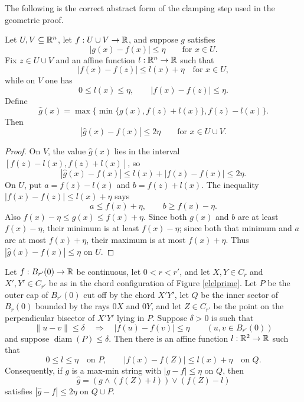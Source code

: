 The following is the correct abstract form of the clamping step used in the geometric proof.

\begin{lemma}
\label{ai:clamping_extension}
Let $U,V\subseteq\mathbb{R}^n$, let $f:U\cup V\to\mathbb{R}$, and suppose $g$ satisfies
\[
|g(x)-f(x)|\leq \eta\qquad\text{for }x\in U.
\]
Fix $z\in U\cup V$ and an affine function $l:\mathbb{R}^n\to\mathbb{R}$ such that
\[
|f(x)-f(z)|\leq l(x)+\eta\quad\text{for }x\in U,
\]
while on $V$ one has
\[
0\leq l(x)\leq\eta,
\qquad
|f(x)-f(z)|\leq\eta.
\]
Define
\[
\widehat g(x)=\max\{\min\{g(x),f(z)+l(x)\},f(z)-l(x)\}.
\]
Then
\[
|\widehat g(x)-f(x)|\leq2\eta\qquad\text{for }x\in U\cup V.
\]
\end{lemma}

\begin{proof}
On $V$, the value $\widehat g(x)$ lies in the interval $[f(z)-l(x),f(z)+l(x)]$, so
\[
|\widehat g(x)-f(x)|\leq l(x)+|f(z)-f(x)|\leq2\eta.
\]
On $U$, put $a=f(z)-l(x)$ and $b=f(z)+l(x)$.  The inequality $|f(x)-f(z)|\leq l(x)+\eta$ says
\[
a\leq f(x)+\eta,
\qquad
b\geq f(x)-\eta.
\]
Also $f(x)-\eta\leq g(x)\leq f(x)+\eta$.  Since both $g(x)$ and $b$ are at least $f(x)-\eta$, their minimum is at least $f(x)-\eta$; since both that minimum and $a$ are at most $f(x)+\eta$, their maximum is at most $f(x)+\eta$.  Thus $|\widehat g(x)-f(x)|\leq\eta$ on $U$.
\end{proof}

\begin{lemma}
\label{ai:sector_extension}
Let $f:B_{r'}(0)\to\mathbb{R}$ be continuous, let $0<r<r'$, and let $X,Y\in C_r$ and $X',Y'\in C_{r'}$ be as in the chord configuration of Figure \ref{elelprime}.  Let $P$ be the outer cap of $B_{r'}(0)$ cut off by the chord $X'Y'$, let $Q$ be the inner sector of $B_r(0)$ bounded by the rays $0X$ and $0Y$, and let $Z\in C_{r'}$ be the point on the perpendicular bisector of $X'Y'$ lying in $P$.  Suppose $\delta>0$ is such that
\[
\lVert u-v\rVert\leq\delta\quad\Longrightarrow\quad |f(u)-f(v)|\leq\eta
\qquad (u,v\in B_{r'}(0))
\]
and suppose $\operatorname{diam}(P)\leq\delta$.  Then there is an affine function $l:\mathbb{R}^2\to\mathbb{R}$ such that
\[
0\leq l\leq\eta\quad\text{on }P,
\qquad
|f(x)-f(Z)|\leq l(x)+\eta\quad\text{on }Q.
\]
Consequently, if $g$ is a max-min string with $|g-f|\leq\eta$ on $Q$, then
\[
\widehat g=(g\wedge(f(Z)+l))\vee(f(Z)-l)
\]
satisfies $|\widehat g-f|\leq2\eta$ on $Q\cup P$.
\end{lemma}

